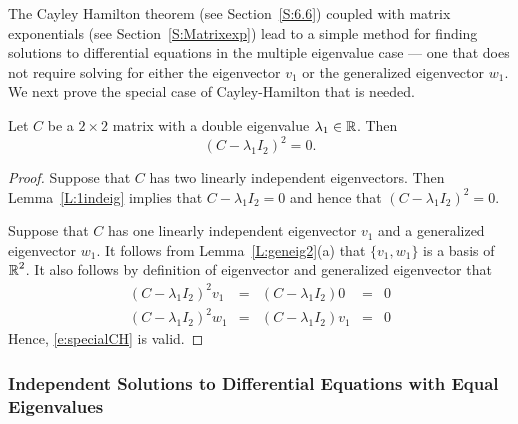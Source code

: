 \documentclass{ximera}
\begin{document}
The Cayley Hamilton theorem (see Section~\ref{S:6.6}) coupled with matrix exponentials 
(see Section~\ref{S:Matrixexp}) lead to a simple 
method for finding solutions to differential equations in the multiple eigenvalue 
case --- one that does not require solving for either the eigenvector $v_1$ 
or the generalized eigenvector $w_1$.  We next prove the special case of
Cayley-Hamilton that is needed.

\begin{lemma} \label{L:specialCH}
Let $C$ be a $2\times 2$ matrix with a double eigenvalue $\lambda_1\in\mbox{$\mathbb{R}$}$. Then
\begin{equation} \label{e:specialCH}
(C-\lambda_1 I_2)^2 = 0.
\end{equation}
\end{lemma}

\begin{proof}
Suppose that $C$ has two linearly independent eigenvectors. Then Lemma~\ref{L:1indeig}
implies that $C-\lambda_1 I_2 = 0$ and hence that $(C-\lambda_1 I_2)^2 = 0$. 

Suppose that $C$ has one linearly independent eigenvector $v_1$ and a generalized 
eigenvector $w_1$.  It follows from Lemma~\ref{L:geneig2}(a) that $\{v_1,w_1\}$ is a basis 
of $\mbox{$\mathbb{R}$}^2$.  It also follows by definition of eigenvector and generalized eigenvector that 
\[
\begin{array}{rclcl}
(C-\lambda_1 I_2)^2v_1 & = & (C-\lambda_1 I_2) 0  & = & 0 \\
(C-\lambda_1 I_2)^2w_1 & = & (C-\lambda_1 I_2) v_1 & = & 0
\end{array}
\]
Hence,  \eqref{e:specialCH} is valid.
\end{proof}

\subsubsection*{Independent Solutions to Differential Equations with
Equal Eigenvalues}
\end{document}

